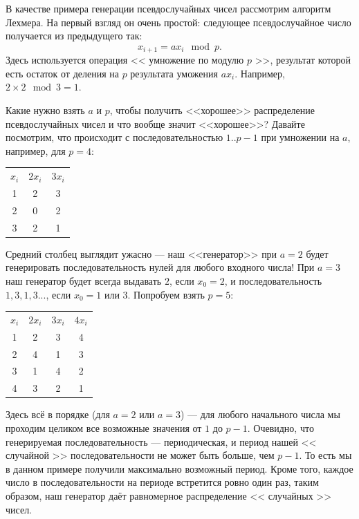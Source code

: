 \documentclass{book}
\begin{document}
В качестве примера генерации псевдослучайных чисел рассмотрим алгоритм Лехмера. На первый взгляд он
очень простой: следующее псевдослучайное число получается из предыдущего так:
\begin{equation}
    x_{i + 1} = a x_i \mod p.
\end{equation}
Здесь используется операция << умножение по модулю $p$ >>, результат которой есть остаток от
деления на $p$ результата уможения $a x_i$. Например, $2 \times 2 \mod 3 = 1$.

Какие нужно взять $a$ и $p$, чтобы получить <<хорошее>> распределение псевдослучайных чисел и что
вообще значит <<хорошее>>? Давайте посмотрим, что происходит с последовательностью $1..p-1$ при
умножении на $a$, например, для $p = 4$:
\begin{table}[h]
    \centering
    \begin{tabular}{ c | c | c }
        $x_i$ & $2 x_i$ & $3 x_i$ \\
        1 & 2 & 3 \\
        2 & 0 & 2 \\
        3 & 2 & 1 \\
    \end{tabular}
\end{table}
Средний столбец выглядит ужасно --- наш <<генератор>> при $a = 2$ будет генерировать
последовательность нулей для любого входного числа! При $a = 3$ наш генератор будет всегда выдавать
$2$, если $x_0 = 2$, и последовательность $1,3,1,3...$, если $x_0 = 1$ или $3$.  Попробуем взять $p
= 5$:
\begin{table}[h]
    \centering
    \begin{tabular}{ c | c | c | c }
        $x_i$ & $2 x_i$ & $3 x_i$ & $4 x_i$ \\
        1 & 2 & 3 & 4 \\
        2 & 4 & 1 & 3 \\
        3 & 1 & 4 & 2 \\
        4 & 3 & 2 & 1 \\
    \end{tabular}
\end{table}
Здесь всё в порядке (для $a = 2$ или $a = 3$) --- для любого начального числа мы проходим целиком все возможные значения от
$1$ до $p - 1$. Очевидно, что генерируемая последовательность --- периодическая, и период нашей << случайной >> последовательности не может быть
больше, чем $p-1$. То есть мы в данном примере получили максимально возможный период. Кроме того,
каждое число в последовательности на периоде встретится ровно один раз, таким образом, наш
генератор даёт равномерное распределение << случайных >> чисел.
\end{document}
